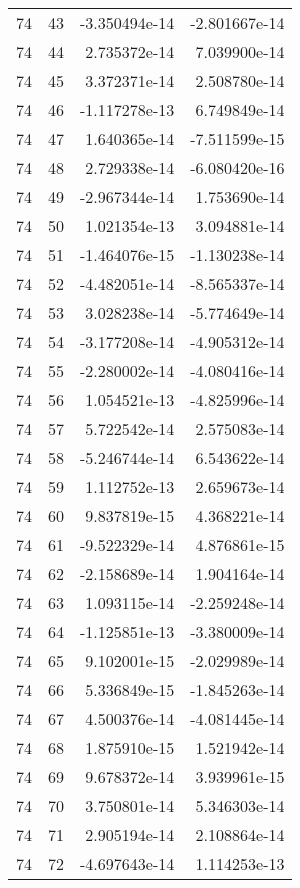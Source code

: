 \begin{tabular}{rrrr}
  74 &   43 & -3.350494e-14 & -2.801667e-14 \\
  74 &   44 &  2.735372e-14 &  7.039900e-14 \\
  74 &   45 &  3.372371e-14 &  2.508780e-14 \\
  74 &   46 & -1.117278e-13 &  6.749849e-14 \\
  74 &   47 &  1.640365e-14 & -7.511599e-15 \\
  74 &   48 &  2.729338e-14 & -6.080420e-16 \\
  74 &   49 & -2.967344e-14 &  1.753690e-14 \\
  74 &   50 &  1.021354e-13 &  3.094881e-14 \\
  74 &   51 & -1.464076e-15 & -1.130238e-14 \\
  74 &   52 & -4.482051e-14 & -8.565337e-14 \\
  74 &   53 &  3.028238e-14 & -5.774649e-14 \\
  74 &   54 & -3.177208e-14 & -4.905312e-14 \\
  74 &   55 & -2.280002e-14 & -4.080416e-14 \\
  74 &   56 &  1.054521e-13 & -4.825996e-14 \\
  74 &   57 &  5.722542e-14 &  2.575083e-14 \\
  74 &   58 & -5.246744e-14 &  6.543622e-14 \\
  74 &   59 &  1.112752e-13 &  2.659673e-14 \\
  74 &   60 &  9.837819e-15 &  4.368221e-14 \\
  74 &   61 & -9.522329e-14 &  4.876861e-15 \\
  74 &   62 & -2.158689e-14 &  1.904164e-14 \\
  74 &   63 &  1.093115e-14 & -2.259248e-14 \\
  74 &   64 & -1.125851e-13 & -3.380009e-14 \\
  74 &   65 &  9.102001e-15 & -2.029989e-14 \\
  74 &   66 &  5.336849e-15 & -1.845263e-14 \\
  74 &   67 &  4.500376e-14 & -4.081445e-14 \\
  74 &   68 &  1.875910e-15 &  1.521942e-14 \\
  74 &   69 &  9.678372e-14 &  3.939961e-15 \\
  74 &   70 &  3.750801e-14 &  5.346303e-14 \\
  74 &   71 &  2.905194e-14 &  2.108864e-14 \\
  74 &   72 & -4.697643e-14 &  1.114253e-13 \\

\end{tabular}
